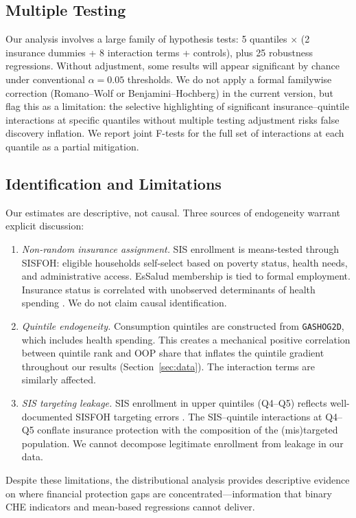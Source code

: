 \subsection{Multiple Testing}

Our analysis involves a large family of hypothesis tests: 5 quantiles $\times$ (2 insurance dummies + 8 interaction terms + controls), plus 25 robustness regressions. Without adjustment, some results will appear significant by chance under conventional $\alpha = 0.05$ thresholds. We do not apply a formal familywise correction (Romano--Wolf or Benjamini--Hochberg) in the current version, but flag this as a limitation: the selective highlighting of significant insurance--quintile interactions at specific quantiles without multiple testing adjustment risks false discovery inflation. We report joint F-tests for the full set of interactions at each quantile as a partial mitigation.

\subsection{Identification and Limitations}

Our estimates are descriptive, not causal. Three sources of endogeneity warrant explicit discussion:

\begin{enumerate}
    \item \textit{Non-random insurance assignment.} SIS enrollment is means-tested through SISFOH: eligible households self-select based on poverty status, health needs, and administrative access. EsSalud membership is tied to formal employment. Insurance status is correlated with unobserved determinants of health spending \citep{Wagstaff2010, Acharya2012}. We do not claim causal identification.

    \item \textit{Quintile endogeneity.} Consumption quintiles are constructed from \texttt{GASHOG2D}, which includes health spending. This creates a mechanical positive correlation between quintile rank and OOP share that inflates the quintile gradient throughout our results (Section~\ref{sec:data}). The interaction terms are similarly affected.

    \item \textit{SIS targeting leakage.} SIS enrollment in upper quintiles (Q4--Q5) reflects well-documented SISFOH targeting errors \citep{Cortez2008, Francke2013}. The SIS--quintile interactions at Q4--Q5 conflate insurance protection with the composition of the (mis)targeted population. We cannot decompose legitimate enrollment from leakage in our data.
\end{enumerate}

Despite these limitations, the distributional analysis provides descriptive evidence on where financial protection gaps are concentrated---information that binary CHE indicators and mean-based regressions cannot deliver.
